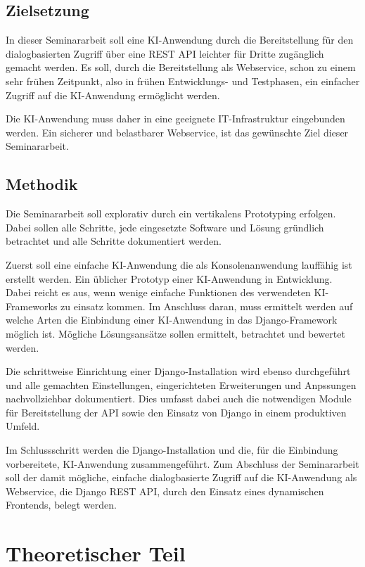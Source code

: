 \documentclass[12pt,oneside,titlepage,listof=totoc,bibliography=totoc]{scrartcl}
\begin{document}
\subsection{Zielsetzung}

In dieser Seminararbeit soll eine \ac{KI}-Anwendung durch die Bereitstellung für den dialogbasierten Zugriff über eine REST API leichter für Dritte zugänglich gemacht werden. Es soll, durch die Bereitstellung als Webservice, schon zu einem sehr frühen Zeitpunkt, also in frühen Entwicklungs- und Testphasen, ein einfacher Zugriff auf die KI-Anwendung ermöglicht werden. 

Die \ac{KI}-Anwendung muss daher in eine geeignete IT-Infrastruktur eingebunden werden. Ein sicherer und belastbarer Webservice, ist das gewünschte Ziel dieser Seminararbeit. 


\subsection{Methodik}

Die Seminararbeit soll explorativ durch ein vertikalens Prototyping erfolgen. Dabei sollen alle Schritte, jede eingesetzte Software und Lösung gründlich betrachtet und alle Schritte dokumentiert werden.

Zuerst soll eine einfache KI-Anwendung die als Konsolenanwendung lauffähig ist erstellt werden. Ein üblicher Prototyp einer KI-Anwendung in Entwicklung. Dabei reicht es aus, wenn wenige einfache Funktionen des verwendeten KI-Frameworks zu einsatz kommen.
Im Anschluss daran, muss ermittelt werden auf welche Arten die Einbindung einer KI-Anwendung in das Django-Framework möglich ist. Mögliche Lösungsansätze sollen ermittelt, betrachtet und bewertet werden. 

Die schrittweise Einrichtung einer Django-Installation wird ebenso durchgeführt und alle gemachten Einstellungen, eingerichteten Erweiterungen und Anpssungen nachvollziehbar dokumentiert. Dies umfasst dabei auch die notwendigen Module für Bereitstellung der API sowie den Einsatz von Django in einem produktiven Umfeld. 

Im Schlussschritt werden die Django-Installation und die, für die Einbindung vorbereitete, KI-Anwendung zusammengeführt. Zum Abschluss der Seminararbeit soll  der damit mögliche, einfache dialogbasierte Zugriff auf die KI-Anwendung als Webservice, die Django REST API, durch den Einsatz eines dynamischen Frontends, belegt werden. 


\section{Theoretischer Teil}
\end{document}

